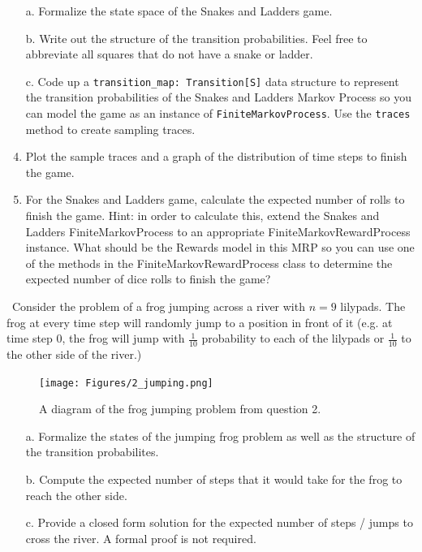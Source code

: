 \documentclass[12pt]{exam}
\begin{document}
\begin{questions}
\begin{enumerate}
	\item[a.] Formalize the state space of the Snakes and Ladders game.
	\item[b.] Write out the structure of the transition probabilities. Feel free to abbreviate all squares that do not have a snake or ladder.
	\item[c.] Code up a \lstinline{transition_map: Transition[S]} data structure to represent the transition probabilities of the Snakes and Ladders Markov Process so you can model the game as an instance of \lstinline{FiniteMarkovProcess}. Use the \lstinline{traces} method to create sampling traces.
	\item[d.] Plot the sample traces and a graph of the distribution of time steps to finish the game.
	\item[e.] For the Snakes and Ladders game, calculate the expected number of rolls to finish the game. Hint: in order to calculate this, extend the Snakes and Ladders FiniteMarkovProcess to an appropriate FiniteMarkovRewardProcess instance. What should be the Rewards model in this MRP so you can use one of the methods in the FiniteMarkovRewardProcess class to determine the expected number of dice rolls to finish the game?
\end{enumerate}
\
\question Consider the problem of a frog jumping across a river with $n=9$ lilypads. The frog at every time step will randomly jump to a position in front of it (e.g. at time step 0, the frog will jump with $\frac{1}{10}$ probability to each of the lilypads or $\frac{1}{10}$ to the other side of the river.)
\begin{figure}
	\begin{center}
		\texttt{[image: Figures/2\_jumping.png]}
	\end{center}
	\caption{A diagram of the frog jumping problem from question 2. }
\end{figure}
\begin{enumerate}
	\item[a.] Formalize the states of the jumping frog problem as well as the structure of the transition probabilites.
	\item[b.] Compute the expected number of steps that it would take for the frog to reach the other side.
	\item[c.] Provide a closed form solution for the expected number of steps / jumps to cross the river. A formal proof is not required. 
\end{enumerate}


\end{questions}
\end{document}
